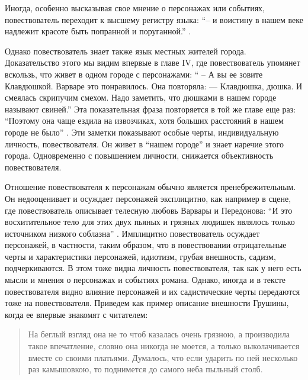 \documentclass[12pt,a4paper]{article}
\begin{document}
Иногда, особенно высказывая свое мнение о персонажах или событиях, повествователь переходит к высшему регистру языка: \enquote{– и воистину в нашем веке надлежит красоте быть попранной и поруганной.} \parencite[51]{sologub2004}.

% 
% 

Однако повествователь знает также язык местных жителей города. Доказательство этого мы видим впервые в главе IV, где повествователь упомянет вскользь, что живет в одном городе с персонажами: \enquote{ – А вы ее зовите Клавдюшкой.
Варваре это понравилось. Она повторяла:
— Клавдюшка, дюшка.
И смеялась скрипучим смехом. Надо заметить, что дюшками в 
нашем городе называют свиней.} \Parencite[33.]{sologub2004} Эта показательная фраза повторяется в той же главе еще раз: \enquote{Поэтому она чаще ездила на извозчиках,
хотя больших расстояний в нашем городе не было} \parencite[34]{sologub2004}. Эти заметки показывают особые черты, индивидуальную личность,  повествователя. Он живет в \enquote{нашем городе} и знает наречие этого города. Одновременно с повышением личности, снижается объективность повествователя.

Отношение повествователя к персонажам обычно является пренебрежительным. Он недооценивает и осуждает персонажей эксплицитно, как например в сцене, где повествователь описывает телесную любовь Варвары и Передонова: 
\enquote{И это восхитительное тело для этих двух пьяных и грязных людишек являлось только источником низкого соблазна} \parencite[51]{sologub2004}.
Имплицитно повествователь осуждает персонажей, в частности, таким образом, что в повествовании отрицательные черты и характеристики персонажей, идиотизм, грубая внешность, садизм, подчеркиваются. В этом тоже видна личность повествователя, так как у него есть мысли и мнения о персонажах и событиях романа. Однако, иногда и в тексте повествователя видно влияние персонажей и их садистические черты передаются тоже на повествователя. Приведем как пример описание внешности Грушины, когда ее впервые знакомят с читателем:


\begin{quote}
На беглый взгляд она не то
чтоб казалась очень грязною, а производила такое впечатление, словно
она никогда не моется, а только выколачивается вместе со своими 
платьями. Думалось, что если ударить по ней несколько раз камышовкою,
то поднимется до самого неба пыльный столб.

\parencite[33.]{sologub2004}
\end{quote}
\end{document}
